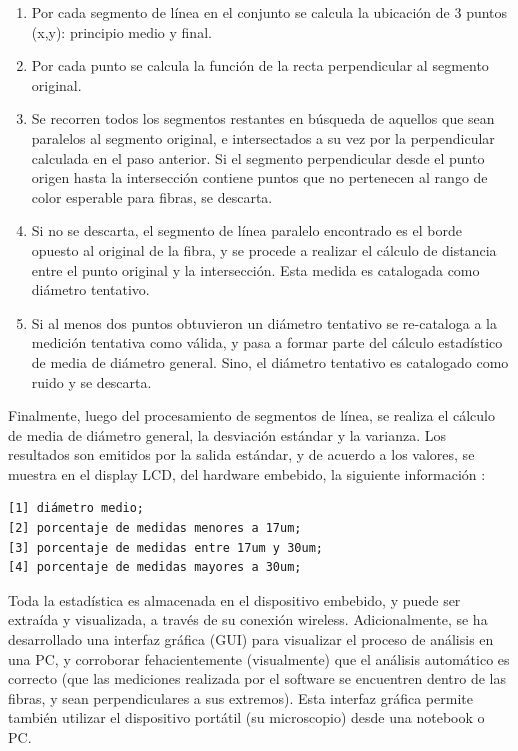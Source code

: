 \documentclass[runningheads,a4paper]{llncs}
\begin{document}
\begin{enumerate}
\item Por cada segmento de línea en el conjunto se calcula la ubicación de 3 puntos (x,y):
principio medio y final. 
\item Por cada punto se calcula la función de la recta perpendicular al segmento original.
\item Se recorren todos los segmentos restantes en búsqueda de aquellos que sean paralelos al segmento original, e intersectados a su vez por la perpendicular calculada en el paso anterior.
Si el segmento perpendicular desde el punto origen hasta la intersección contiene puntos que no pertenecen al rango de color esperable para fibras, se descarta.
\item Si no se descarta,  el segmento de línea paralelo encontrado es el borde opuesto al original de la fibra, y se procede a realizar el cálculo de distancia entre el punto original y la intersección. Esta medida es catalogada como diámetro tentativo.
\item Si al menos dos puntos obtuvieron un diámetro tentativo se re-cataloga a la medición tentativa como válida, y pasa a formar parte del cálculo estadístico de media de diámetro general. Sino, el diámetro tentativo es catalogado como ruido y se descarta.
\end{enumerate}

	Finalmente, luego del procesamiento de segmentos de línea, se realiza el cálculo de media de diámetro general, la desviación estándar y la varianza.
	Los resultados son emitidos por la salida estándar, y de acuerdo a los valores, se muestra en el display LCD, del hardware embebido, la siguiente información :
\begin{Verbatim}
[1] diámetro medio;
[2] porcentaje de medidas menores a 17um;
[3] porcentaje de medidas entre 17um y 30um;
[4] porcentaje de medidas mayores a 30um;
\end{Verbatim}

Toda la estadística es almacenada en el dispositivo embebido, y puede ser extraída y visualizada, a través de su conexión wireless. Adicionalmente, se ha desarrollado una interfaz gráfica (GUI) para visualizar el proceso de análisis en una PC, y corroborar fehacientemente (visualmente) que el análisis automático es correcto (que las mediciones realizada por el software se encuentren dentro de las fibras, y sean perpendiculares a sus extremos). Esta interfaz gráfica permite también utilizar el dispositivo portátil (su microscopio) desde una notebook o PC. 
\end{document}
